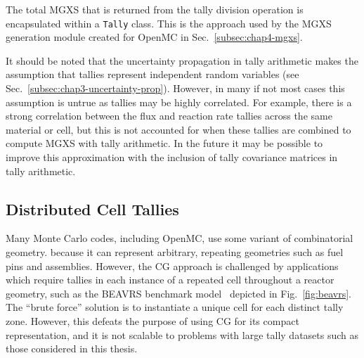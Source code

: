 \noindent The total \ac{MGXS} that is returned from the tally division operation is encapsulated within a \texttt{Tally} class. This is the approach used by the \ac{MGXS} generation module created for OpenMC in Sec.~\ref{subsec:chap4-mgxs}.

It should be noted that the uncertainty propagation in tally arithmetic makes the assumption that tallies represent independent random variables (see Sec.~\ref{subsec:chap3-uncertainty-prop}). However, in many if not most cases this assumption is untrue as tallies may be highly correlated. For example, there is a strong correlation between the flux and reaction rate tallies across the same material or cell, but this is not accounted for when these tallies are combined to compute \ac{MGXS} with tally arithmetic. In the future it may be possible to improve this approximation with the inclusion of tally covariance matrices in tally arithmetic.

\subsection{Distributed Cell Tallies}
\label{subsec:chap4-distribcells}

Many Monte Carlo codes, including OpenMC, use some variant of combinatorial geometry. because it can represent arbitrary, repeating geometries such as fuel pins and assemblies. However, the \ac{CG} approach is challenged by applications which require tallies in each instance of a repeated cell throughout a reactor geometry, such as the \ac{BEAVRS} benchmark model~\cite{horelik2013beavrs} depicted in Fig.~\ref{fig:beavrs}. The ``brute force'' solution is to instantiate a unique cell for each distinct tally zone. However, this defeats the purpose of using \ac{CG} for its compact representation, and it is not scalable to problems with large tally datasets such as those considered in this thesis.

